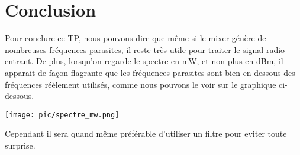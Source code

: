\documentclass[a4paper,12pt]{report}            %
\begin{document}
\chapter{Conclusion}

    Pour conclure ce TP, nous pouvons dire que même si le mixer génère de nombreuses fréquences parasites, 
il reste très utile pour traiter le signal radio entrant. De plus, lorsqu'on regarde le spectre en mW, et non plus
en dBm, il apparait de façon flagrante que les fréquences parasites sont bien en dessous des fréquences
réèlement utilisés, comme nous pouvons le voir sur le graphique ci-dessous. 
\begin{center}\texttt{[image: pic/spectre\_mw.png]}\\ \end{center}
Cependant il sera quand même préférable d'utiliser un filtre pour eviter toute surprise.
\end{document}
